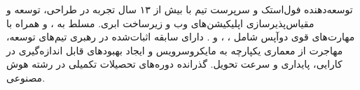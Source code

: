 

\begin{cvparagraph}

توسعه‌دهنده فول‌استک و سرپرست تیم با بیش از ۱۳ سال تجربه در طراحی، توسعه و مقیاس‌پذیرسازی اپلیکیشن‌های وب و زیرساخت ابری. مسلط به ،  و  همراه با مهارت‌های قوی دوآپس شامل ، ،  و . دارای سابقه اثبات‌شده در رهبری تیم‌های توسعه، مهاجرت از معماری یکپارچه به مایکروسرویس و ایجاد بهبودهای قابل اندازه‌گیری در کارایی، پایداری و سرعت تحویل. گذرانده دوره‌های تحصیلات تکمیلی در رشته هوش مصنوعی.

\end{cvparagraph}
